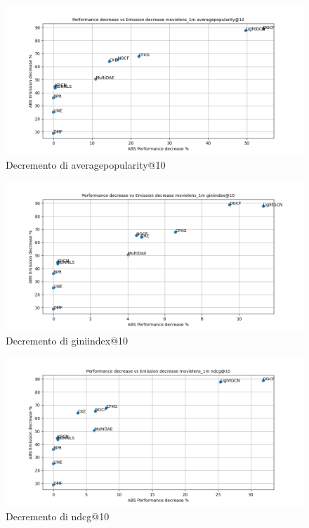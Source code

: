 \begin{figure}[H]
    \centering
    \includegraphics[scale=0.5]{images/decrement_averagepopularity@10_movielens_1m_30_5.png}
    \caption{Decremento di averagepopularity@10}
\end{figure}

\begin{figure}[H]
    \centering
    \includegraphics[scale=0.5]{images/decrement_giniindex@10_movielens_1m_30_5.png}
    \caption{Decremento di giniindex@10}
\end{figure}

\begin{figure}[H]
    \centering
    \includegraphics[scale=0.5]{images/decrement_ndcg@10_movielens_1m_30_5.png}
    \caption{Decremento di ndcg@10}
\end{figure}


